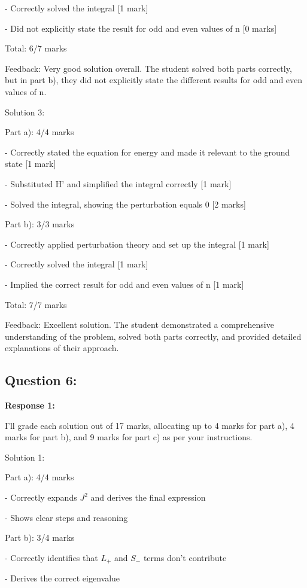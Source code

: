 \documentclass[a4paper,11pt]{article}
\begin{document}
- Correctly solved the integral [1 mark]

- Did not explicitly state the result for odd and even values of n [0 marks]

Total: 6/7 marks

Feedback: Very good solution overall. The student solved both parts correctly, but in part b), they did not explicitly state the different results for odd and even values of n.

Solution 3:

Part a): 4/4 marks

- Correctly stated the equation for energy and made it relevant to the ground state [1 mark]

- Substituted H' and simplified the integral correctly [1 mark]

- Solved the integral, showing the perturbation equals 0 [2 marks]

Part b): 3/3 marks

- Correctly applied perturbation theory and set up the integral [1 mark]

- Correctly solved the integral [1 mark]

- Implied the correct result for odd and even values of n [1 mark]

Total: 7/7 marks

Feedback: Excellent solution. The student demonstrated a comprehensive understanding of the problem, solved both parts correctly, and provided detailed explanations of their approach.

\subsection*{Question 6:}

\textbf{Response 1:}

I'll grade each solution out of 17 marks, allocating up to 4 marks for part a), 4 marks for part b), and 9 marks for part c) as per your instructions.

Solution 1:

Part a): 4/4 marks

- Correctly expands \(J^2\) and derives the final expression

- Shows clear steps and reasoning

Part b): 3/4 marks

- Correctly identifies that \(L_+\) and \(S_-\) terms don't contribute

- Derives the correct eigenvalue
\end{document}
